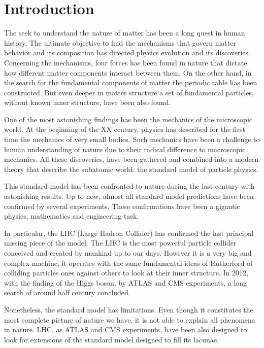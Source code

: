 \chapter*{Introduction}

The seek to understand the nature of matter has been a long quest in human history. The ultimate objective to find the mechanisms that govern matter behavior and its composition has directed physics evolution and its discoveries. Concerning the mechanisms, four forces has been found in nature that dictate how different matter components interact between them. On the other hand, in the search for the fundamental components of matter the periodic table has been constructed. But even deeper in matter structure a set of fundamental particles, without known inner structure, have been also found. 

One of the most astonishing findings has been the mechanics of the microscopic world. At the beginning of the XX century, physics has described for the first time the mechanics of very small bodies. Such mechanics have been a challenge to human understanding of nature due to their radical difference to macroscopic mechanics. All these discoveries, have been gathered and combined into a modern theory that describe the subatomic world: the standard model of particle physics. 

This standard model has been confronted to nature during the last century with astonishing results. Up to now, almost all standard model predictions have been confirmed by several experiments. These confirmations have been a gigantic physics, mathematics and engineering task.

In particular, the LHC (Large Hadron Collider) has confirmed the last principal missing piece of the model. The LHC is the most powerful particle collider conceived and created by mankind up to our days. However it is a very big and complex machine, it operates with the same fundamental ideas of Rutherford of colliding particles ones against others to look at their inner structure. In 2012, with the finding of the Higgs boson, by ATLAS and CMS experiments, a long search of around half century concluded.

Nonetheless, the standard model has limitations. Even though it constitutes the most complete picture of nature we have, it is not able to explain all phenomena in nature. LHC, as ATLAS and CMS experiments, have been also designed to look for extensions of the standard model designed to fill its lacunae. 

